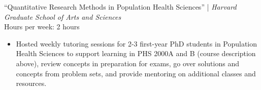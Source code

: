 \documentclass{cv_style}
\begin{document}
``Quantitative Research Methods in Population Health Sciences'' | \textit{Harvard Graduate School of Arts and Sciences}\\
Hours per week: 2 hours
\begin{itemize}
  \vspace{0em} \item Hosted weekly tutoring sessions for 2-3 first-year PhD students in Population Health Sciences to support learning in PHS 2000A and B (course description above), review concepts in preparation for exams, go over solutions and concepts from problem sets, and provide mentoring on additional classes and resources.
\end{itemize}
\end{document}
